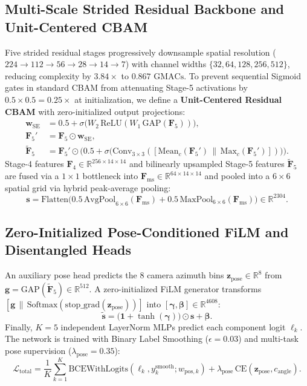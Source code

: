 \documentclass[journal]{IEEEtran}
\begin{document}
\subsection{Multi-Scale Strided Residual Backbone and Unit-Centered CBAM}
Five strided residual stages progressively downsample spatial resolution ($224 \to 112 \to 56 \to 28 \to 14 \to 7$) with channel widths $\{32, 64, 128, 256, 512\}$, reducing complexity by $3.84\times$ to $0.867\text{ GMACs}$. To prevent sequential Sigmoid gates in standard CBAM from attenuating Stage-5 activations by $0.5 \times 0.5 = 0.25\times$ at initialization, we define a \textbf{Unit-Centered Residual CBAM} with zero-initialized output projections:
\begin{align}
\mathbf{w}_{\text{SE}} &= 0.5 + \sigma\big(W_2\,\text{ReLU}(W_1\,\text{GAP}(\mathbf{F}_5))\big), \\
\mathbf{F}_5' &= \mathbf{F}_5 \odot \mathbf{w}_{\text{SE}}, \\
\tilde{\mathbf{F}}_5 &= \mathbf{F}_5' \odot \Big(0.5 + \sigma\big(\text{Conv}_{3\times 3}([\text{Mean}_c(\mathbf{F}_5') \,\|\, \text{Max}_c(\mathbf{F}_5')])\big)\Big).
\end{align}
Stage-4 features $\mathbf{F}_4 \in \mathbb{R}^{256 \times 14 \times 14}$ and bilinearly upsampled Stage-5 features $\tilde{\mathbf{F}}_5$ are fused via a $1\times 1$ bottleneck into $\mathbf{F}_{\text{ms}} \in \mathbb{R}^{64 \times 14 \times 14}$ and pooled into a $6\times 6$ spatial grid via hybrid peak-average pooling:
\begin{equation}
\mathbf{s} = \text{Flatten}\Big(0.5\,\text{AvgPool}_{6\times 6}(\mathbf{F}_{\text{ms}}) + 0.5\,\text{MaxPool}_{6\times 6}(\mathbf{F}_{\text{ms}})\Big) \in \mathbb{R}^{2304}.
\end{equation}

\subsection{Zero-Initialized Pose-Conditioned FiLM and Disentangled Heads}
An auxiliary pose head predicts the 8 camera azimuth bins $\mathbf{z}_{\text{pose}} \in \mathbb{R}^8$ from $\mathbf{g} = \text{GAP}(\tilde{\mathbf{F}}_5) \in \mathbb{R}^{512}$. A zero-initialized FiLM generator transforms $[\mathbf{g} \,\|\, \text{Softmax}(\text{stop\_grad}(\mathbf{z}_{\text{pose}}))]$ into $[\boldsymbol{\gamma}, \boldsymbol{\beta}] \in \mathbb{R}^{4608}$:
\begin{equation}
\tilde{\mathbf{s}} = \big(\mathbf{1} + \tanh(\boldsymbol{\gamma})\big) \odot \mathbf{s} + \boldsymbol{\beta}.
\end{equation}
Finally, $K=5$ independent LayerNorm MLPs predict each component logit $\ell_k$. The network is trained with Binary Label Smoothing ($\epsilon = 0.03$) \cite{muller2019labelsmoothing} and multi-task pose supervision ($\lambda_{\text{pose}} = 0.35$):
\begin{equation}
\mathcal{L}_{\text{total}} = \frac{1}{K}\sum_{k=1}^{K} \text{BCEWithLogits}(\ell_k, y_k^{\text{smooth}}; w_{\text{pos}, k}) + \lambda_{\text{pose}}\,\text{CE}(\mathbf{z}_{\text{pose}}, c_{\text{angle}}).
\end{equation}
\end{document}
